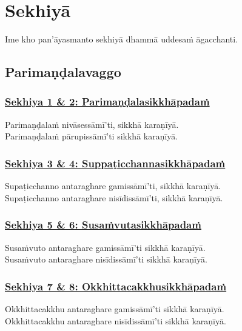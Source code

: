 \section{Sekhiyā}
\label{sekh}

\begin{intro}
  Ime kho pan'āyasmanto sekhiyā dhammā uddesaṁ āgacchanti.
\end{intro}

\setsubsecheadstyle{\subsectionFmt}
\subsection{Parimaṇḍalavaggo}
\vspace{0.2cm}

\subsubsection*{\hyperref[training1-2]{Sekhiya 1 \& 2: Parimaṇḍalasikkhāpadaṁ}}
\label{sekh1-2}
Parimaṇḍalaṁ nivāsessāmī'ti, sikkhā karaṇīyā.\\
Parimaṇḍalaṁ pārupissāmī'ti sikkhā karaṇīyā.

\subsubsection*{\hyperref[training3-4]{Sekhiya 3 \& 4: Suppaṭicchannasikkhāpadaṁ}}
\label{sekh3-4}
Supaṭicchanno antaraghare gamissāmī'ti, sikkhā karaṇīyā.\\
Supaṭicchanno antaraghare nisīdissāmī'ti, sikkhā karaṇīyā.

\subsubsection*{\hyperref[training5-6]{Sekhiya 5 \& 6: Susaṁvutasikkhāpadaṁ}}
\label{sekh5-6}
Susaṁvuto antaraghare gamissāmī'ti sikkhā karaṇīyā.\\
Susaṁvuto antaraghare nisīdissāmī'ti sikkhā karaṇīyā.

\subsubsection*{\hyperref[training7-8]{Sekhiya 7 \& 8: Okkhittacakkhusikkhāpadaṁ}}
\label{sekh7-8}
Okkhittacakkhu antaraghare gamissāmī'ti sikkhā karaṇīyā.\\
Okkhittacakkhu antaraghare nisīdissāmī'ti sikkhā karaṇīyā.

